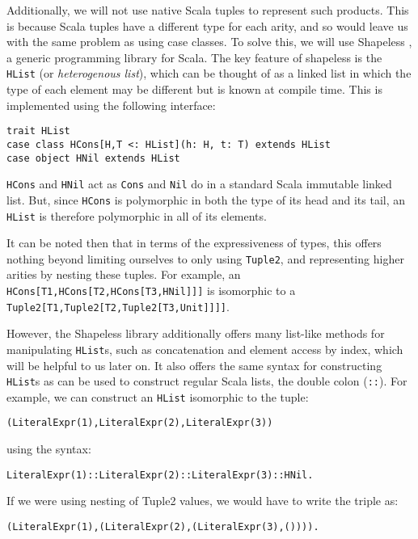 Additionally, we will not use native Scala tuples to represent such products. This is because Scala tuples have a different type for each arity, and so would leave us with the same problem as using case classes. To solve this, we will use Shapeless \cite{shapeless}, a generic programming library for Scala. The key feature of shapeless is the \lstinline{HList} (or \textit{heterogenous list}), which can be thought of as a linked list in which the type of each element may be different but is known at compile time. This is implemented using the following interface:
\vs\begin{lstlisting}
trait HList
case class HCons[H,T <: HList](h: H, t: T) extends HList
case object HNil extends HList
\end{lstlisting}\vs
\lstinline{HCons} and \lstinline{HNil} act as \lstinline{Cons} and \lstinline{Nil} do in a standard Scala immutable linked list. But, since \lstinline{HCons} is polymorphic in both the type of its head and its tail, an \lstinline{HList} is therefore polymorphic in all of its elements.

It can be noted then that in terms of the expressiveness of types, this offers nothing beyond limiting ourselves to only using \lstinline{Tuple2}, and representing higher arities by nesting these tuples. For example, an \lstinline{HCons[T1,HCons[T2,HCons[T3,HNil]]]} is isomorphic to a \lstinline{Tuple2[T1,Tuple2[T2,Tuple2[T3,Unit]]]]}.

However, the Shapeless library additionally offers many list-like methods for manipulating \lstinline{HList}s, such as concatenation and element access by index, which will be helpful to us later on. It also offers the same syntax for constructing \lstinline{HList}s as can be used to construct regular Scala lists, the double colon (\lstinline{::}). For example, we can construct an \lstinline{HList} isomorphic to the tuple:
\vs\begin{lstlisting}
(LiteralExpr(1),LiteralExpr(2),LiteralExpr(3))
\end{lstlisting}\vs
using the syntax:
\vs\begin{lstlisting}
LiteralExpr(1)::LiteralExpr(2)::LiteralExpr(3)::HNil.
\end{lstlisting}\vs
If we were using nesting of Tuple2 values, we would have to write the triple as:
\vs\begin{lstlisting}
(LiteralExpr(1),(LiteralExpr(2),(LiteralExpr(3),()))).
\end{lstlisting}\vs


